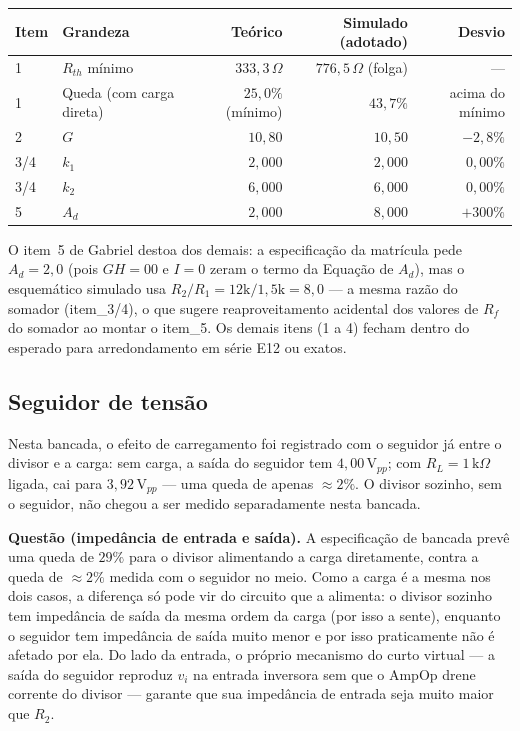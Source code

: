 \documentclass[11pt,a4paper]{article}
\begin{document}
\begin{center}
\begin{tabular}{@{}llrrr@{}}
\toprule
\textbf{Item} & \textbf{Grandeza} & \textbf{Teórico} & \textbf{Simulado (adotado)} & \textbf{Desvio} \\
\midrule
1 & $R_{th}$ mínimo & $333{,}3\,\Omega$ & $776{,}5\,\Omega$ (folga) & — \\
1 & Queda (com carga direta) & $25{,}0\%$ (mínimo) & $43{,}7\%$ & acima do mínimo \\
2 & $G$ & $10{,}80$ & $10{,}50$ & $-2{,}8\%$ \\
3/4 & $k_1$ & $2{,}000$ & $2{,}000$ & $0{,}00\%$ \\
3/4 & $k_2$ & $6{,}000$ & $6{,}000$ & $0{,}00\%$ \\
5 & $A_d$ & $2{,}000$ & $8{,}000$ & $+300\%$ \\
\bottomrule
\end{tabular}
\end{center}

O item~5 de Gabriel destoa dos demais: a especificação da matrícula pede $A_d{=}2{,}0$
(pois $GH{=}00$ e $I{=}0$ zeram o termo da Equação de $A_d$), mas o esquemático simulado usa
$R_2/R_1=12\text{k}/1{,}5\text{k}=8{,}0$ — a mesma razão do somador (item\_3/4), o que sugere
reaproveitamento acidental dos valores de $R_f$ do somador ao montar o item\_5. Os demais
itens (1 a 4) fecham dentro do esperado para arredondamento em série E12 ou exatos.

\subsection{Seguidor de tensão}

Nesta bancada, o efeito de carregamento foi registrado com o seguidor já entre o divisor e a
carga: sem carga, a saída do seguidor tem $4{,}00\,\text{V}_{pp}$; com $R_L{=}1\,\text{k}
\Omega$ ligada, cai para $3{,}92\,\text{V}_{pp}$ — uma queda de apenas ${\approx}2\%$. O
divisor sozinho, sem o seguidor, não chegou a ser medido separadamente nesta bancada.

\textbf{Questão (impedância de entrada e saída).} A especificação de bancada prevê uma queda
de $29\%$ para o divisor alimentando a carga diretamente, contra a queda de ${\approx}2\%$
medida com o seguidor no meio. Como a carga é a mesma nos dois casos, a diferença só pode vir
do circuito que a alimenta: o divisor sozinho tem impedância de saída da mesma ordem da carga
(por isso a sente), enquanto o seguidor tem impedância de saída muito menor e por isso
praticamente não é afetado por ela. Do lado da entrada, o próprio mecanismo do curto virtual —
a saída do seguidor reproduz $v_i$ na entrada inversora sem que o AmpOp drene corrente do
divisor — garante que sua impedância de entrada seja muito maior que $R_2$.
\end{document}
